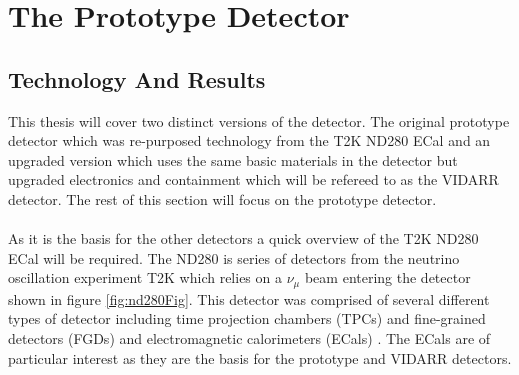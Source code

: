 
\chapter{The Prototype Detector}\label{Chp:ThePrototypeDetector}

\ifpdf
    \graphicspath{{Chapter2/Figs/Raster/}{Chapter2/Figs/PDF/}{Chapter2/Figs/}}
\else
    \graphicspath{{Chapter2/Figs/Vector/}{Chapter2/Figs/}}
\fi

\section{Technology And Results}
This thesis will cover two distinct versions of the detector. The original prototype detector which was re-purposed technology from the T2K ND280 ECal \cite{Allan_2013} and an upgraded version which uses the same basic materials in the detector but upgraded electronics and containment which will be refereed to as the VIDARR detector. The rest of this section will focus on the prototype detector.
\\\\As it is the basis for the other detectors a quick overview of the T2K ND280 ECal will be required. The ND280 is series of detectors from the neutrino oscillation experiment T2K which relies on a $\nu_\mu$ beam entering the detector shown in figure \ref{fig:nd280Fig}. This detector was comprised of several different types of detector including time projection chambers (TPCs) and fine-grained detectors (FGDs) and electromagnetic calorimeters (ECals) \cite{Allan_2013}. The ECals are of particular interest as they are the basis for the prototype and VIDARR detectors. 

